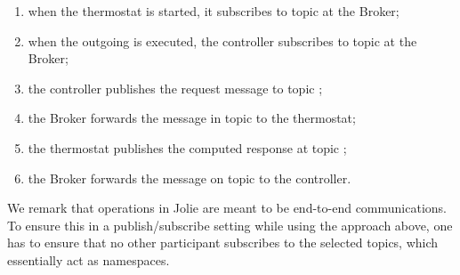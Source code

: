 \begin{enumerate}
 \item when the thermostat is started, it subscribes to topic  at the
       Broker;

 \item when the outgoing  is executed, the controller
       subscribes to topic  at the Broker;

 \item the controller publishes the request message to topic
       ;

 \item the Broker forwards the message in topic  to
       the thermostat;

 \item the thermostat publishes the computed response at topic ;

 \item the Broker forwards the message on topic  to the
       controller.

\end{enumerate}

We remark that  operations in Jolie are meant to be end-to-end
communications. To ensure this in a publish/subscribe setting while using the
approach above, one has to ensure that no other participant subscribes to the
selected topics, which essentially act as namespaces.
